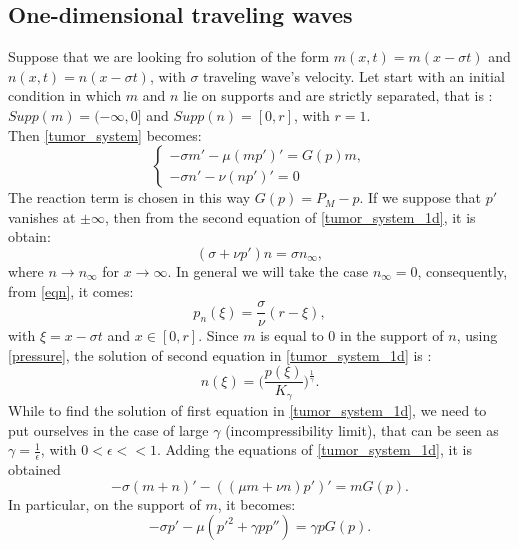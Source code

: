 \subsection{One-dimensional traveling waves}
Suppose that we are looking fro solution of the form $ m(x,t) = m (x - \sigma  t) $ and $n(x,t) = n (x - \sigma  t)$, with $ \sigma $ traveling wave's velocity. Let start with an initial condition in which $ m $ and $ n $ lie on supports and are strictly separated, that is : $ Supp (m) = (-\infty, 0] $ and $ Supp (n) =  [0,r] $, with $ r = 1 $.\\
 Then \eqref{tumor_system} becomes:
\begin{equation}
\label{tumor_system_1d}
\begin{cases}
-\sigma m' - \mu (mp')' = G(p)m, \\
- \sigma n' - \nu (n p')' = 0
\end{cases}
\end{equation}
The reaction term is chosen in this way $ G(p) = P_M -p $. If we suppose that $ p' $ vanishes at $\pm \infty$, then from the second equation of \eqref{tumor_system_1d}, it is obtain:
\begin{equation}
\label{eqn}
(\sigma + \nu p')n = \sigma n_{\infty},
\end{equation}
where $ n \rightarrow n_{\infty} $ for $ x \rightarrow \infty $. In general we will take the case $ n_\infty = 0 $, consequently, from \eqref{eqn}, it comes:
\begin{equation}
\label{pn}
p_n(\xi) = \frac{\sigma}{\nu} (r - \xi),
\end{equation}
with $ \xi = x - \sigma t $ and $ x \in [0, r] $. Since $ m  $ is equal to 0 in the support of $ n $, using \eqref{pressure}, the solution of second equation in \eqref{tumor_system_1d} is :
\begin{equation*}
n(\xi) = \Big(\frac{p(\xi)}{K_\gamma} \Big)^\frac{1}{\gamma}.
\end{equation*}
While to find the solution of first equation in \eqref{tumor_system_1d}, we need to put ourselves in the case of large $ \gamma $ (incompressibility limit), that can be seen as  $ \gamma =  \frac{1}{\epsilon} $, with $ 0 < \epsilon << 1 $. Adding the equations of \eqref{tumor_system_1d}, it is obtained
\begin{equation}
\label{sum_eq}
-\sigma (m  + n)' - ((\mu m + \nu n)p')' = m G(p).
\end{equation} 
In particular, on the support of $ m $, it becomes: 
\begin{equation*}
-\sigma p ' - \mu (p'^2 + \gamma p p'') = \gamma p G(p).
\end{equation*}
